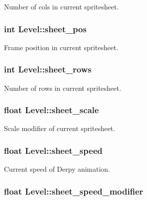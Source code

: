 Number of cols in current spritesheet. \hypertarget{structLevel_a21c699af201ffe60ccd1319b3f540947}{
\subsubsection[{sheet\-\_\-pos}]{\setlength{\rightskip}{0pt plus 5cm}int Level\-::sheet\-\_\-pos}}\label{structLevel_a21c699af201ffe60ccd1319b3f540947}
Frame position in current spritesheet. \hypertarget{structLevel_a6d608b79c9b4dd8a5efc0c7e5fb482b0}{
\subsubsection[{sheet\-\_\-rows}]{\setlength{\rightskip}{0pt plus 5cm}int Level\-::sheet\-\_\-rows}}\label{structLevel_a6d608b79c9b4dd8a5efc0c7e5fb482b0}
Number of rows in current spritesheet. \hypertarget{structLevel_a267a140bd3de1fc3f23a88623de425ed}{
\subsubsection[{sheet\-\_\-scale}]{\setlength{\rightskip}{0pt plus 5cm}float Level\-::sheet\-\_\-scale}}\label{structLevel_a267a140bd3de1fc3f23a88623de425ed}
Scale modifier of current spritesheet. \hypertarget{structLevel_a41db1345ac158898450907010a49748f}{
\subsubsection[{sheet\-\_\-speed}]{\setlength{\rightskip}{0pt plus 5cm}float Level\-::sheet\-\_\-speed}}\label{structLevel_a41db1345ac158898450907010a49748f}
Current speed of Derpy animation. \hypertarget{structLevel_a3cae10fd441bcc14b6a47dd5fedafa59}{
\subsubsection[{sheet\-\_\-speed\-\_\-modifier}]{\setlength{\rightskip}{0pt plus 5cm}float Level\-::sheet\-\_\-speed\-\_\-modifier}}\label{structLevel_a3cae10fd441bcc14b6a47dd5fedafa59}
